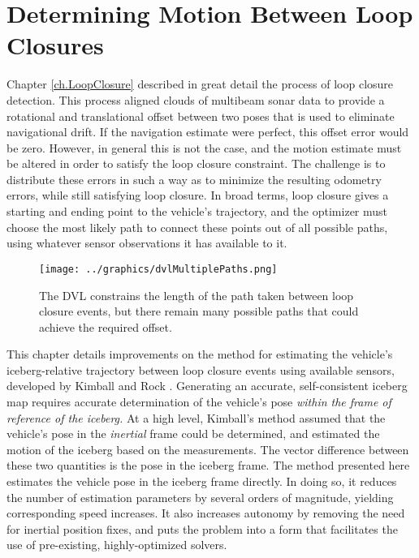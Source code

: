 
\chapter{Determining Motion Between Loop Closures}
\label{ch.IcebergGeometry}

Chapter \ref{ch.LoopClosure} described in great detail the process of loop closure detection. This process aligned clouds of multibeam sonar data to provide a rotational and translational offset between two poses that is used to eliminate navigational drift. If the navigation estimate were perfect, this offset error would be zero. However, in general this is not the case, and the motion estimate must be altered in order to satisfy the loop closure constraint. The challenge is to distribute these errors in such a way as to minimize the resulting odometry errors, while still satisfying loop closure. In broad terms, loop closure gives a starting and ending point to the vehicle's trajectory, and the optimizer must choose the most likely path to connect these points out of all possible paths, using whatever sensor observations it has available to it. 

\begin{figure}[htbp]
   \centering
   \texttt{[image: ../graphics/dvlMultiplePaths.png]} %
   \caption{The DVL constrains the length of the path taken between loop closure events, but there remain many possible paths that could achieve the required offset.}
   \label{fig:MultiPath}
\end{figure}

This chapter details improvements on the method for estimating the vehicle's iceberg-relative trajectory between loop closure events using available sensors, developed by Kimball and Rock \cite{}. Generating an accurate, self-consistent iceberg map requires accurate determination of the vehicle's pose \emph{within the frame of reference of the iceberg.} At a high level, Kimball's method assumed that the vehicle's pose in the \emph{inertial} frame could be determined, and estimated the motion of the iceberg based on the measurements. The vector difference between these two quantities is the pose in the iceberg frame. The method presented here estimates the vehicle pose in the iceberg frame directly. In doing so, it reduces the number of estimation parameters by several orders of magnitude, yielding corresponding speed increases. It also increases autonomy by removing the need for inertial position fixes, and puts the problem into a form that facilitates the use of pre-existing, highly-optimized solvers.

